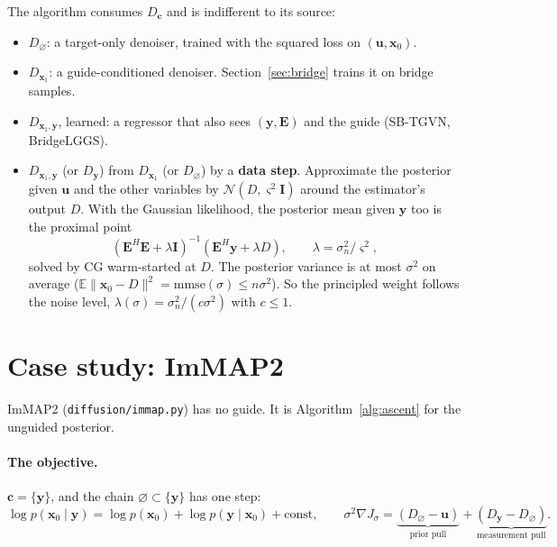 \documentclass[11pt]{article}
\theoremstyle{remark}
\newcommand{\x}{\bm{x}}
\newcommand{\y}{\bm{y}}
\newcommand{\uu}{\bm{u}}
\newcommand{\cc}{\bm{c}}
\newcommand{\E}{\mathbb{E}}
\newcommand{\N}{\mathcal{N}}
\newcommand{\Id}{\bm{I}}
\newcommand{\Op}{\bm{E}}
\newcommand{\grad}{\nabla}
\newcommand{\code}[1]{\texttt{#1}}
\newcommand{\Dz}{D_{\varnothing}}
\newcommand{\Dg}{D_{\x_1}}
\newcommand{\Dy}{D_{\y}}
\newcommand{\Dgy}{D_{\x_1,\y}}
\begin{document}
The algorithm consumes $D_{\cc}$ and is indifferent to its source:
\begin{itemize}[leftmargin=1.5em, itemsep=2pt]
  \item $\Dz$: a target-only denoiser, trained with the squared loss on $(\uu,\x_0)$.
  \item $\Dg$: a guide-conditioned denoiser. Section~\ref{sec:bridge} trains it on bridge
        samples.
  \item $\Dgy$, learned: a regressor that also sees $(\y,\Op)$ and the guide (SB-TGVN,
        BridgeLGGS).
  \item $\Dgy$ (or $\Dy$) from $\Dg$ (or $\Dz$) by a \textbf{data step}. Approximate the
        posterior given $\uu$ and the other variables by $\N(D,\varsigma^2\Id)$ around the
        estimator's output $D$. With the Gaussian likelihood, the posterior mean given $\y$ too
        is the proximal point
        \begin{equation}
          (\Op^H\Op + \lambda\Id)^{-1}(\Op^H\y + \lambda D),\qquad
          \lambda = \sigma_n^2/\varsigma^2,
          \label{eq:prox}
        \end{equation}
        solved by CG warm-started at $D$. The posterior variance is at most $\sigma^2$ on
        average ($\E\|\x_0 - D\|^2 = \mathrm{mmse}(\sigma)\le n\sigma^2$). So the principled
        weight follows the noise level, $\lambda(\sigma) = \sigma_n^2/(c\sigma^2)$ with
        $c\le1$.
\end{itemize}

\section{Case study: ImMAP2}\label{sec:immap2}

ImMAP2 (\code{diffusion/immap.py}) has no guide. It is Algorithm~\ref{alg:ascent} for the
unguided posterior.

\paragraph{The objective.} $\cc = \{\y\}$, and the chain $\varnothing\subset\{\y\}$ has one step:
\[
  \log p(\x_0\mid\y) = \log p(\x_0) + \log p(\y\mid\x_0) + \mathrm{const},
  \qquad
  \sigma^2\grad J_\sigma = \underbrace{(\Dz-\uu)}_{\text{prior pull}}
  + \underbrace{(\Dy-\Dz)}_{\text{measurement pull}} .
\]
\end{document}
